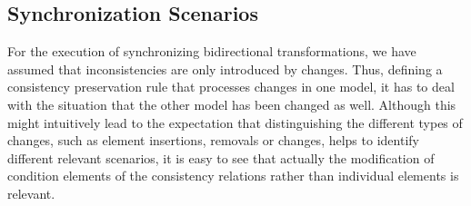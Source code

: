 



\subsection{Synchronization Scenarios}

For the execution of synchronizing bidirectional transformations, we have assumed that inconsistencies are only introduced by changes.
Thus, defining a consistency preservation rule that processes changes in one model, it has to deal with the situation that the other model has been changed as well.
Although this might intuitively lead to the expectation that distinguishing the different types of changes, such as element insertions, removals or changes, helps to identify different relevant scenarios, it is easy to see that actually the modification of condition elements of the consistency relations rather than individual elements is relevant.

